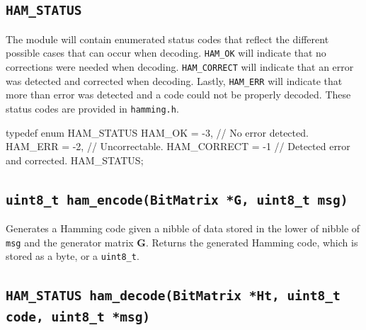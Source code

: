 \documentclass[11pt]{article}
\begin{document}
\subsection{\texttt{HAM\_STATUS}}

The module will contain enumerated status codes that reflect the
different possible cases that can occur when decoding. \texttt{HAM\_OK}
will indicate that no corrections were needed when decoding.
\texttt{HAM\_CORRECT} will indicate that an error was detected and
corrected when decoding. Lastly, \texttt{HAM\_ERR} will indicate that
more than error was detected and a code could not be properly decoded.
These status codes are provided in \texttt{hamming.h}.

\begin{codelisting}{}
typedef enum HAM_STATUS {
    HAM_OK      = -3,  // No error detected.
    HAM_ERR     = -2,  // Uncorrectable.
    HAM_CORRECT = -1   // Detected error and corrected.
} HAM_STATUS;
\end{codelisting}

%

\subsection{\texttt{uint8\_t ham\_encode(BitMatrix *G, uint8\_t msg)}}

Generates a Hamming code given a nibble of data stored in the lower of
nibble of \texttt{msg} and the generator matrix $\boldsymbol{G}$.
Returns the generated Hamming code, which is stored as a byte, or a
\texttt{uint8\_t}.

\subsection{\texttt{HAM\_STATUS ham\_decode(BitMatrix *Ht, uint8\_t
code, uint8\_t *msg)}} \label{ham_dec}
\end{document}
